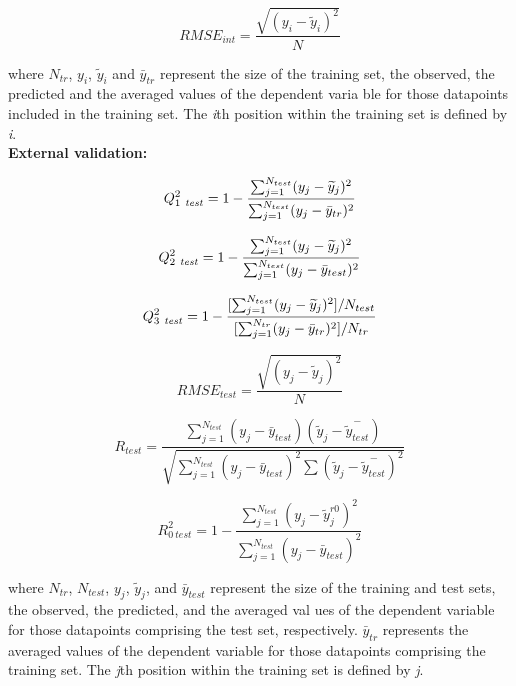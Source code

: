\documentclass[twoside,a4wide,12pt]{article}\usepackage[]{graphicx}\usepackage[]{color}
\begin{document}
\begin{equation}
RMSE_{int} = \frac {\sqrt {(y_i - \widetilde{y}_i)^{2}}} {N}
\end{equation}

where $N_{tr}$, $y_i$, $\widetilde{y}_i$ and $\bar{y}_{tr}$ represent the size of the training set, the observed, the predicted and the averaged values of the dependent varia
ble for those datapoints included in the training set. The {\it i}th position within the training set is defined by {\it i}.\\


{\bf External validation:}

\begin{equation}
Q_{1\ {\it test}}^{2} = 1 - \frac {\sum_{j=1}^{N_{test}} (y_j-\widetilde{y}_j)^{2}}  {\sum_{j=1}^{N_{test}} (y_j - \bar{y}_{tr})^{2}}
\end{equation}

\begin{equation}
Q_{2\ {\it test}}^{2} = 1 - \frac {\sum_{j=1}^{N_{test}} (y_j-\widetilde{y}_j)^{2}}  {\sum_{j=1}^{N_{test}} (y_j - \bar{y}_{test})^{2}}
\end{equation}

\begin{equation}
Q_{3\ {\it test}}^{2} = 1 - \frac {[\sum_{j=1}^{N_{test}} (y_j-\widetilde{y}_j)^{2}] / N_{test} }  {[ \sum_{j=1}^{N_{tr}} (y_j - \bar{y}_{tr})^{2}] / N_{tr}}
\end{equation}

\begin{equation}
RMSE_{test} = \frac {\sqrt {(y_j - \widetilde{y}_j)^{2}}} {N} 
\end{equation}

\begin{equation}
R_{test} = \frac {{\sum_{j=1}^{N_{test}} (y_{j} - \bar{y}_{test})}  (\widetilde{y}_{j} - \overset{-}{\widetilde{y}_{test}})} 
{\sqrt{\sum_{j=1}^{N_{test}} (y_{j} - \bar{y}_{test})^{2} \sum{ (\widetilde{y}_{j} - \overset{-}{\widetilde{y}_{test}})^{2}}}}
\end{equation}

\begin{equation}
R_{0\:test}^2 = 1 - \frac {\sum_{j=1}^{N_{test}} (y_{j} - \widetilde{y}_{j}^{ r0})^{2}} {\sum_{j=1}^{N_{test}} (y_{j} - \bar{y}_{test})^{2}} 
\end{equation}

where $N_{tr}$, $N_{test}$, $y_j$, $\widetilde{y}_j$, and $\bar{y}_{test}$ represent the size of the training and test sets, the observed, the predicted, and the averaged val
ues of the dependent variable for those datapoints comprising the test set, respectively.
$\bar{y}_{tr}$ represents the averaged values of the dependent variable for those datapoints comprising the training set.
The {\it j}th position within the training set is defined by {\it j}.\\ 
\end{document}
